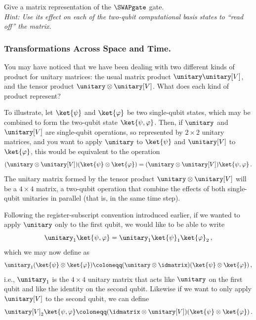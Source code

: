     \begin{exercise}
      Give a matrix representation of the $\SWAPgate$ gate.\\
      \emph{Hint: Use its effect on each of the two-qubit computational basis states to ``read
      off'' the matrix.}
    \end{exercise}

    \subsubsection{Transformations Across Space and Time.}
      You may have noticed that we have been dealing with two different kinds of
        product for unitary matrices: the usual matrix product
        $\unitary \unitary[V]$, and the tensor product 
        $\unitary \otimes \unitary[V]$. What does each kind of product represent?

      To illustrate, let $\ket{\psi}$ and $\ket{\varphi}$ be two single-qubit
        states, which may be combined to form the two-qubit state $\ket{\psi, \varphi}$.
        Then, if $\unitary$ and $\unitary[V]$ are single-qubit operations,
        so represented by $2 \times 2$ unitary matrices, 
        and you want to apply $\unitary$ to $\ket{\psi}$ and
        $\unitary[V]$ to $\ket{\varphi}$, this would be equivalent to the
        operation
      \[
        (\unitary \otimes \unitary[V])(\ket{\psi} \otimes \ket{\varphi})
          = (\unitary \otimes \unitary[V]) \ket{\psi, \varphi}\, .
      \]
      The unitary matrix formed by the tensor product 
        $\unitary \otimes \unitary[V]$
        will be a $4 \times 4$ matrix, 
        a two-qubit operation that combine the effects
        of both single-qubit unitaries in parallel
        (that is, in the same time step).

      Following the register-subscript convention introduced earlier, if we wanted to
        apply $\unitary$ only to the first qubit, we would like to be able to write 
      \[
        \unitary_1 \ket{\psi, \varphi} = \unitary_1 \ket{\psi}_1 \ket{\varphi}_2\, ,
      \]
      which we may now define as
      \[
        \unitary_1 (\ket{\psi} \otimes \ket{\varphi})
        \coloneqq (\unitary \otimes \idmatrix)(\ket{\psi} \otimes
        \ket{\varphi})\, ,
      \]
      i.e., $\unitary_1$ is the $4 \times 4$ unitary matrix that acts like $\unitary$ on
      the first qubit and like the identity on the second qubit.
      Likewise if we want to only apply $\unitary[V]$ to the second qubit, we
      can define
      \[
        \unitary[V]_2 \ket{\psi, \varphi}
        \coloneqq (\idmatrix \otimes \unitary[V])(\ket{\psi} \otimes \ket{\varphi})\, .
      \]

